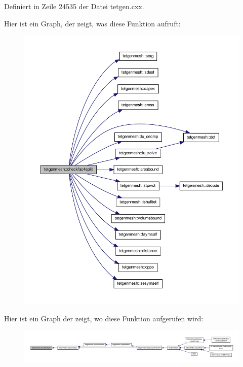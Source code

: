 Definiert in Zeile 24535 der Datei tetgen.\-cxx.



Hier ist ein Graph, der zeigt, was diese Funktion aufruft\-:\nopagebreak
\begin{figure}[H]
\begin{center}
\leavevmode
\includegraphics[width=350pt]{classtetgenmesh_aa70e994f2091786686a9336461e5d94d_cgraph}
\end{center}
\end{figure}




Hier ist ein Graph der zeigt, wo diese Funktion aufgerufen wird\-:\nopagebreak
\begin{figure}[H]
\begin{center}
\leavevmode
\includegraphics[width=350pt]{classtetgenmesh_aa70e994f2091786686a9336461e5d94d_icgraph}
\end{center}
\end{figure}


